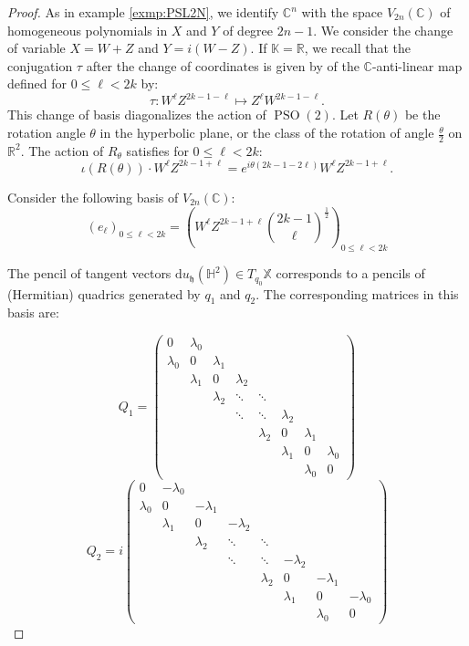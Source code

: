 \documentclass[reqno,10pt]{amsart}
\theoremstyle{plain}
\theoremstyle{definition}
\theoremstyle{remark}
\newcommand{\R}{\mathbb{R}}
\newcommand{\C}{\mathbb{C}}
\newcommand{\K}{\mathbb{K}}
\DeclareMathOperator{\PSO}{PSO}
\newcommand{\X}{\mathbb{X}}
\begin{document}
\begin{proof}

As in example \ref{exmp:PSL2N}, we identify $\C^n$ with the space $V_{2n}(\C)$ of homogeneous polynomials in $X$ and $Y$ of degree $2n-1$. We consider the change of variable $X=W+Z$ and $Y=i(W-Z)$. If $\K=\R$, we recall that the conjugation $\tau$ after the change of coordinates is given by of the $\C$-anti-linear map defined for $0\leq \ell<2k$ by:
 $$\tau: W^\ell Z^{2k-1-\ell}\mapsto Z^\ell W^{2k-1-\ell}.$$ 
 This change of basis diagonalizes the action of $\PSO(2)$. Let $R(\theta)$ be the rotation angle $\theta$ in the hyperbolic plane, or the class of the rotation of angle $\frac{\theta}{2}$ on $\R^2$. The action of $R_\theta$ satisfies for $0\leq \ell<2k$:
  $$\iota\left(R\left(\theta\right)\right)\cdot W^\ell Z^{2k-1+\ell}= e^{i\theta(2k-1-2\ell)}W^\ell Z^{2k-1+\ell}.$$
 
Consider the following basis of $V_{2n}(\C)$:
 $$(e_\ell)_{0\leq \ell<2k}=\left(W^\ell Z^{2k-1+\ell} \binom{2k-1}{\ell}^{\frac{1}{2}}\right)_{0\leq \ell<2k}$$  

 The pencil of tangent vectors $\mathrm{d}u_\mathfrak{h}(\mathbb{H}^2)\in T_{q_0}\X$ corresponds to a pencils of (Hermitian) quadrics generated by $q_1$ and $q_2$. The corresponding matrices in this basis are:

$$Q_1=\begin{pmatrix}
0& \lambda_0 & & & && \\
\lambda_0 & 0 & \lambda_1& & &&  \\
& \lambda_1 & 0&\lambda_2 & &&  \\
 &    &\lambda_2&\ddots &\ddots  && \\
  &    &&\ddots&\ddots &\lambda_2  & \\
 &  & && \lambda_2& 0& \lambda_1 \\
 &  & && & \lambda_1& 0& \lambda_0\\
 &  & && & &\lambda_0&  0\end{pmatrix}$$$$Q_2=i\begin{pmatrix}
0& -\lambda_0 & & & && \\
\lambda_0 & 0 & -\lambda_1& & &&  \\
& \lambda_1 & 0&-\lambda_2 & &&  \\
 &    &\lambda_2&\ddots &\ddots  && \\
  &    &&\ddots&\ddots &-\lambda_2  & \\
 &  & && \lambda_2& 0& -\lambda_1 \\
 &  & && & \lambda_1& 0& -\lambda_0\\
 &  & && & &\lambda_0&  0\end{pmatrix}$$
 

\end{proof}
\end{document}
